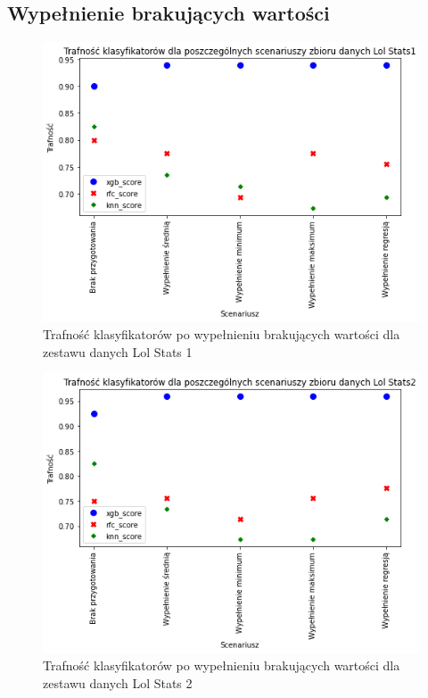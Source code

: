 \documentclass{book}
\begin{document}
\subsection{Wypełnienie brakujących wartości}
\begin{figure}[H]
\centerline{\includegraphics{Lol_Stats_1_Wypełnienie_brakujących}}
\centering
\caption{Trafność klasyfikatorów po wypełnieniu brakujących wartości dla zestawu danych Lol Stats 1}
\end{figure}

\begin{figure}[H]
\centerline{\includegraphics{Lol_Stats_2_Wypełnienie_brakujących}}
\centering
\caption{Trafność klasyfikatorów po wypełnieniu brakujących wartości dla zestawu danych Lol Stats 2}
\end{figure}
\end{document}
